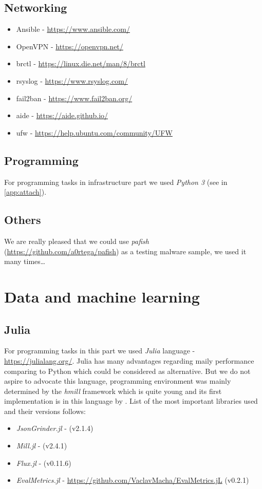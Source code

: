 \subsection*{Networking}
\begin{itemize}
  \item Ansible - \url{https://www.ansible.com/}
  \item OpenVPN - \url{https://openvpn.net/}
  \item brctl - \url{https://linux.die.net/man/8/brctl}
  \item rsyslog - \url{https://www.rsyslog.com/}
  \item fail2ban - \url{https://www.fail2ban.org/}
  \item aide - \url{https://aide.github.io/}
  \item ufw - \url{https://help.ubuntu.com/community/UFW}
\end{itemize}

\subsection*{Programming}
For programming tasks in infrastructure part we used \emph{Python 3} (see in \ref{app:attach}).
\subsection*{Others}
We are really pleased that we could use \emph{pafish} (\url{https://github.com/a0rtega/pafish}) as a testing malware sample, we used it many times\dots

\section*{Data and machine learning}
\subsection*{Julia}
For programming tasks in this part we used \emph{Julia} language - \url{https://julialang.org/}. Julia has many advantages regarding maily performance comparing to Python which could be considered as alternative. But we do not aspire to advocate this language, programming environment was mainly determined by the \emph{hmill} framework which is quite young and its first implementation is in this language by \cite{Mandlik2020}. List of the most important libraries used and their versions follows:
\begin{itemize}
  \item \emph{JsonGrinder.jl} - \cite{Pevny2019} (v2.1.4)
  \item \emph{Mill.jl} - \cite{Pevny2018} (v2.4.1)
  \item \emph{Flux.jl} - \cite{Innes2018a, Innes2018} (v0.11.6)
  \item \emph{EvalMetrics.jl} - \url{https://github.com/VaclavMacha/EvalMetrics.jL} (v0.2.1)
\end{itemize}
